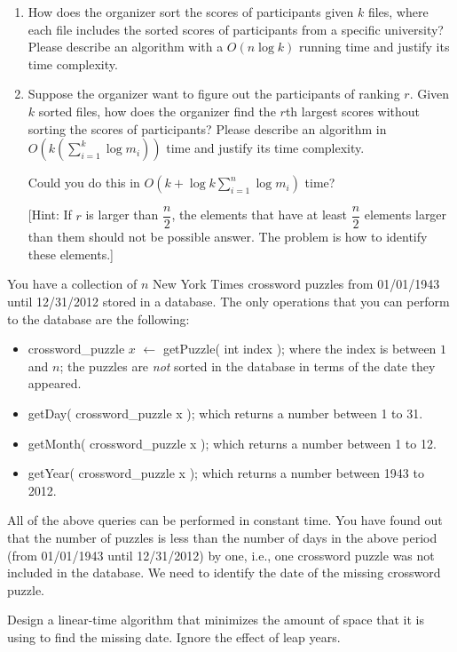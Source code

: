 \documentclass{article}
\begin{document}
\begin{enumerate}
\item How does the organizer sort the scores of participants given $k$
  files, where each file includes the sorted scores of participants
  from a specific university?  Please describe an algorithm with a
  $O(n\log k)$ running time and justify its time complexity.

\item Suppose the organizer want to figure out the participants of
  ranking $r$. Given $k$ sorted files, how does the organizer find the
  $r$th largest scores without sorting the scores of participants? Please 
  describe an algorithm in $O(k(\sum_{i=1}^{k}\log m_{i}))$ time and justify
  its time complexity. 

Could you do this in $O(k+\log k \sum_{i=1}^{n}\log m_{i})$ time? 

  [Hint: If $r$ is larger than $\dfrac{n}{2}$, the elements that have at least $\dfrac{n}{2}$ 
  elements larger than them should not be possible answer. The problem is how to identify these
  elements.]\\

\end{enumerate}


 You have a collection of $n$ New York Times
crossword puzzles from 01/01/1943 until 12/31/2012 stored in a
database. The only operations that you can perform to the database are
the following:
\begin{itemize}
\item crossword\_puzzle $x$ $\leftarrow$ getPuzzle( int index ); where the
  index is between $1$ and $n$; the puzzles are \emph{not} sorted in the
  database in terms of the date they appeared.
\item getDay( crossword\_puzzle x ); which returns a number between 1
  to 31.
\item getMonth( crossword\_puzzle x ); which returns a number between
  1 to 12.
\item getYear( crossword\_puzzle x ); which returns a number between
  1943 to 2012.
\end{itemize}
All of the above queries can be performed in constant time. You have
found out that the number of puzzles is less than the number of days
in the above period (from 01/01/1943 until 12/31/2012) by one, i.e.,
one crossword puzzle was not included in the database. We need to
identify the date of the missing crossword puzzle.

Design a linear-time algorithm that minimizes the amount of space that
it is using to find the missing date. Ignore the effect of leap years.\\
\end{document}
